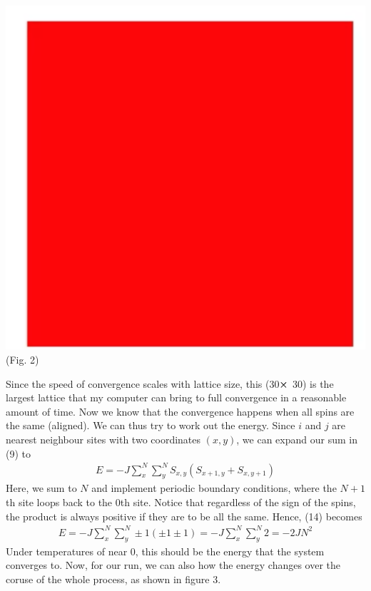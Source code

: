 \documentclass{article}
\begin{document}
\begin{center}
    \includegraphics[scale=.1]{fullAlign.png}\\[-3.9pt] 
    (Fig. 2)
\end{center}
Since the speed of convergence scales with lattice size, this (30$\cross$ 30)
is the largest lattice that my computer can bring to full convergence in a 
reasonable amount of time. Now we know that the convergence happens when all spins are the same (aligned).
We can thus try to work out the energy. Since $i$ and $j$ are nearest neighbour sites with two coordinates $(x,y)$, 
we can expand our sum in (9) to 
\begin{align}
    E=-J\sum^N_x\sum^N_yS_{x,y}(S_{x+1,y}+S_{x,y+1})
\end{align}
Here, we sum to $N$ and implement periodic boundary conditions, where the $N+1$th site 
loops back to the 0th site. Notice that regardless of the sign of the spins, the product is always positive if 
they are to be all the same. Hence, (14) becomes 
\begin{align}
    E=-J\sum_x^N\sum_y^N\pm1(\pm1\pm1)=-J\sum_x^N\sum_y^N2=-2JN^2
\end{align}
Under temperatures of near 0, this should be the energy that 
the system converges to. Now, for our run, we can also how the energy changes over the coruse of the
whole process, as shown in figure 3.
\end{document}
